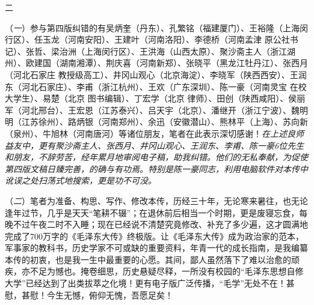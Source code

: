 \documentclass[../../dazhuan.tex]{subfiles}
\begin{document}
\par\mbox{}

{\centering {}\kaishu 二 \par}   
 
（\emph{一}）参与第四版纠错的有吴炳奎（丹东）、孔繁铭（福建厦门）、王裕隆（上海闵行区）、任玉龙（河南安阳）、王建叶（河南洛阳）、李德桥（河南孟津 原公社书记）、张哲、梁治洲（上海闵行区）、王洪海（山西太原）、聚沙斋主人（浙江湖州）、欧建国（湖南湘潭）、荆庆喜（河南新郑）、张晓平（黑龙江牡丹江）、张西月（河北石家庄 教授级高工）、井冈山观心（北京海淀）、李晓军（陕西西安）、王润东（河北石家庄）、李甫（浙江杭州）、王欢（广东深圳）、陈一豪（河南灵宝 在校大学生）、易楚（北京 图书编辑）、丁宏学（北京 律师）、田创（陕西咸阳）、侯丽军（河北邢台）、王宏恩（江苏泰兴）、吕天宇（北京）、潘继开（浙江宁波）、魏明明（江苏徐州）、路炳银（河南郑州）、余迅（安徽潜山）、熊林平（上海）、苏向新（泉州）、牛旭林（河南唐河）等诸位朋友，笔者在此表示深切感谢！\emph{在上述良师益友中，更有聚沙斋主人、张西月、井冈山观心、王润东、李甫、陈一豪6位先生和朋友，不辞劳苦，经年累月地审阅电子稿，助我纠错。他们的无私奉献，为促使第四版文稿日臻完善，的确与有功焉。特别是陈一豪同志，利用电脑软件对本传中讹误之处扫荡式地搜索，更是功不可没。}

（\emph{二}）笔者为准备、构思、写作、修改本传，历经三十年，无论寒来暑往，也无论逢年过节，几乎是天天“笔耕不辍”；在退休前后相当一个时期，更是废寝忘食，每晚不过午夜二时不入睡；现在已经说不清楚究竟修改、补充了多少遍，这才圆满地完成了700万字的《毛泽东大传》终极版。让《毛泽东大传》成为政治家的范本，军事家的教科书，历史学家不可或缺的重要资料，年青一代的成长指南，是我编纂本传的初衷，也是我一生中最重要的心愿。其间，鄙人虽然落下了难以治愈的顽疾，亦不足为憾也。掩卷细思，历史悬疑尽释，一所没有校园的“毛泽东思想自修大学”已经达到了出类拔萃之化境！更有电子版广泛传播，“毛学”无处不在！甚慰，甚慰！今生无憾，俯仰无愧，吾愿足矣！

\mbox{}\par
{}    
\end{document}
